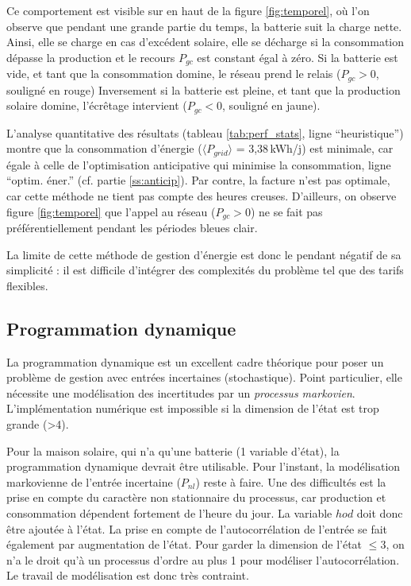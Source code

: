 \documentclass[a4paper,10pt,twocolumn]{article}
\providecommand{\avg}[1]{\langle#1\rangle}
\begin{document}
Ce comportement est visible sur en haut de la figure \ref{fig:temporel},
où l'on observe que pendant une grande partie du temps,
la batterie suit la charge nette. Ainsi, elle se charge en cas d'excédent solaire,
elle se décharge si la consommation dépasse la production
et le recours $P_{gc}$ est constant égal à zéro.
Si la batterie est vide, et tant que la consommation domine,
le réseau prend le relais ($P_{gc}>0$, souligné en rouge)
Inversement si la batterie est pleine, et tant que la production solaire domine,
l'écrêtage intervient ($P_{gc}<0$, souligné en jaune).

L'analyse quantitative des résultats (tableau \ref{tab:perf_stats}, ligne ``heuristique'')
montre que la consommation d'énergie ($\avg{P_{grid}}$ = 3,38\,kWh/j) est minimale, car égale à celle de 
l'optimisation anticipative qui minimise la consommation, ligne ``optim. éner.''
(cf. partie \ref{ss:anticip}).
Par contre, la facture n'est pas optimale, car cette méthode ne tient pas compte
des heures creuses. D'ailleurs, on observe figure \ref{fig:temporel}
que l'appel au réseau ($P_{gc}>0$) ne se fait pas préférentiellement pendant
les périodes bleues clair.

La limite de cette méthode de gestion d'énergie est donc le pendant négatif
de sa simplicité : il est difficile d'intégrer des complexités du problème
tel que des tarifs flexibles.

\subsection{Programmation dynamique}
La programmation dynamique\cite{Bertsekas:2005:DPOC_vol1} est un
excellent cadre théorique pour poser un problème de gestion avec entrées incertaines (stochastique).
Point particulier, elle nécessite une modélisation des incertitudes par un \emph{processus markovien}\cite{Haessig:2013:ESPy}.
L'implémentation numérique est impossible
si la dimension de l'état est trop grande (>4).

Pour la maison solaire, qui n'a qu'une batterie (1 variable d'état),
la programmation dynamique devrait être utilisable.
Pour l'instant, la modélisation markovienne de l'entrée incertaine ($P_{nl}$) reste à faire.
Une des difficultés est la prise en compte du caractère non stationnaire
du processus, car production et consommation dépendent fortement de l'heure du jour.
La variable $hod$ doit donc être ajoutée à l'état.
La prise en compte de l'autocorrélation de l'entrée se fait également par augmentation
de l'état\cite[§1.4]{Bertsekas:2005:DPOC_vol1}.
Pour garder la dimension de l'état $\leq 3$, on n'a le droit qu'à un processus d'ordre
au plus 1 pour modéliser l'autocorrélation.
Le travail de modélisation est donc très contraint.
\end{document}
